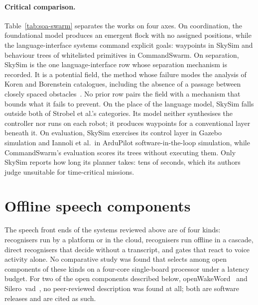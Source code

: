 \paragraph{Critical comparison.} Table~\ref{tab:soa-swarm} separates the works on four axes. On
coordination, the foundational model produces an emergent flock with no assigned positions, while
the language-interface systems command explicit goals: waypoints in SkySim and behaviour trees of
whitelisted primitives in CommandSwarm. On separation, SkySim is the one language-interface row
whose separation mechanism is recorded. It is a potential field, the method whose failure modes the
analysis of Koren and Borenstein catalogues, including the absence of a passage between closely
spaced obstacles~\cite{koren1991}. No prior row pairs the field with a mechanism that bounds what it
fails to prevent. On the place of the language model, SkySim falls outside both of Strobel et al.'s
categories. Its model neither synthesises the controller nor runs on each robot; it produces
waypoints for a conventional layer beneath it. On evaluation, SkySim exercises its control layer in
Gazebo simulation and Iannoli et al.\ in ArduPilot software-in-the-loop simulation, while
CommandSwarm's evaluation scores its trees without executing them. Only SkySim reports how long its
planner takes: tens of seconds, which its authors judge unsuitable for time-critical missions.

\section{Offline speech components}
\label{sec:speech-components}
The speech front ends of the systems reviewed above are of four kinds: recognisers run by a
platform or in the cloud, recognisers run offline in a cascade, direct recognisers that decide
without a transcript, and gates that react to voice activity alone. No comparative study was found
that selects among open components of these kinds on a four-core single-board processor under a
latency budget. For two of the open components described below, openWakeWord~\cite{oww} and
Silero~\gls{vad}~\cite{silero}, no peer-reviewed description was found at all; both are software
releases and are cited as such.

